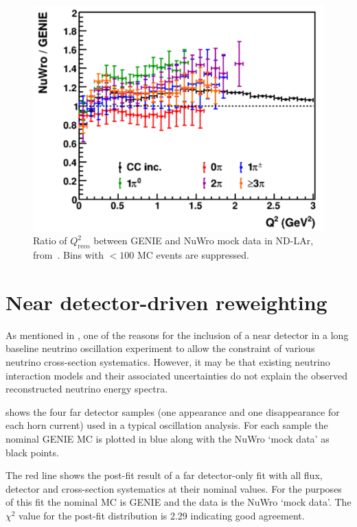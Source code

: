 \begin{figure}[h]
	\centering
	\includegraphics[width=.6\linewidth]{files/figures/dune_ndrwt/larQ2Reco}
	\caption[Ratio of $Q^{2}_{\textrm{reco}}$ between GENIE and NuWro mock data in ND-LAr]{Ratio of $Q^{2}_{\textrm{reco}}$ between GENIE and NuWro mock data in ND-LAr, from~\cite{ndCdr}. Bins with $<100$ MC events are suppressed.}
	\label{fig:q2LarFhc}	
\end{figure}

\section{Near detector-driven reweighting}

As mentioned in , one of the reasons for the inclusion of a near detector in a long baseline neutrino oscillation experiment to allow the constraint of various neutrino cross-section systematics.
However, it may be that existing neutrino interaction models and their associated uncertainties do not explain the observed reconstructed neutrino energy spectra.


 shows the four far detector samples (one appearance and one disappearance for each horn current) used in a typical oscillation analysis.
For each sample the nominal GENIE MC is plotted in blue along with the NuWro `mock data' as black points.

The red line shows the post-fit result of a far detector-only fit with all flux, detector and cross-section systematics at their nominal values. 
For the purposes of this fit the nominal MC is GENIE and the data is the NuWro `mock data'.
The $\chi^{2}$ value for the post-fit distribution is 2.29 indicating good agreement.

